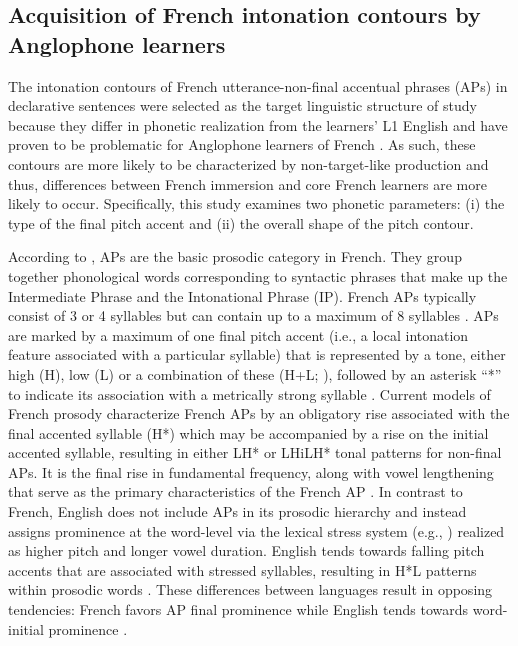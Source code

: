 \documentclass[output=paper,colorlinks,citecolor=brown,draftmode]{langscibook}
\begin{document}
\subsection{Acquisition of French intonation contours by Anglophone learners}\label{sec:11:2.3}
The intonation contours of French utterance-non-final accentual phrases (APs) in declarative sentences were selected as the target linguistic structure of study because they differ in phonetic realization from the learners’ L1 English and have proven to be problematic for Anglophone learners of French \citep{Colantoni:2014, Lepetit1989, Sunara2018}. As such, these contours are more likely to be characterized by non-target-like production and thus, differences between French immersion and core French learners are more likely to occur. Specifically, this study examines two phonetic parameters: (i) the type of the final pitch accent and (ii) the overall shape of the pitch contour.


According to \citet{JunFougeron:2000,JunFougeron2002}, APs are the basic prosodic category in French. They group together phonological words corresponding to syntactic phrases that make up the Intermediate Phrase and the Intonational Phrase (IP). French APs typically consist of 3 or 4 syllables but can contain up to a maximum of 8 syllables \citep{JunFougeron2002}. APs are marked by a maximum of one final pitch accent (i.e., a local intonation feature associated with a particular syllable) that is represented by a tone, either high (H), low (L) or a combination of these (H+L; \citealt{Jun2005}), followed by an asterisk “*” to indicate its association with a metrically strong syllable \citep{Sunara2018}. Current models of French prosody \citep{JunFougeron2002, Welby2006} characterize French APs by an obligatory rise associated with the final accented syllable (H*) which may be accompanied by a rise on the initial accented syllable, resulting in either LH* or LHiLH* tonal patterns for non-final APs. It is the final rise in fundamental frequency, along with vowel lengthening that serve as the primary characteristics of the French AP \citep{Sunara2018}. In contrast to French, English does not include APs in its prosodic hierarchy \citep{PierrehumbertHirschberg:1990} and instead assigns prominence at the word-level via the lexical stress system (e.g., \citealt{Hayes1995}) realized as higher pitch and longer vowel duration. English tends towards falling pitch accents that are associated with stressed syllables, resulting in H*L patterns within prosodic words \citep{Bullock2009}. These differences between languages result in opposing tendencies: French favors AP final prominence while English tends towards word-initial prominence \citep{Clopper2002}.
\end{document}
